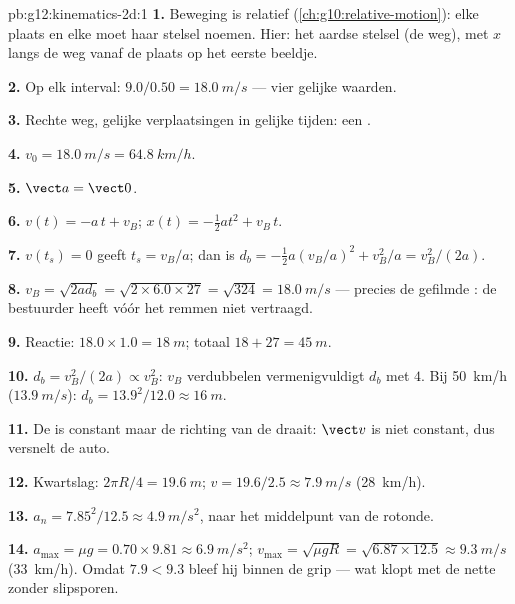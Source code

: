 \begin{solution}{pb:g12:kinematics-2d:1}
\textbf{1.} Beweging is relatief (\cref{ch:g10:relative-motion}): elke
plaats en elke  moet haar stelsel noemen. Hier: het aardse stelsel
(de weg), met $x$ langs de weg vanaf de plaats op het eerste beeldje.

\textbf{2.} Op elk interval: $9.0/0.50 = \qty{18.0}{m/s}$ --- vier gelijke
waarden.

\textbf{3.} Rechte weg, gelijke verplaatsingen in gelijke tijden: een
.

\textbf{4.} $v_0 = \qty{18.0}{m/s} = \qty{64.8}{km/h}$.

\textbf{5.} $\vect a = \vect 0$.

\textbf{6.} $v(t) = -a\,t + v_B$; $x(t) = -\tfrac12 a t^2 + v_B\,t$.

\textbf{7.} $v(t_s) = 0$ geeft $t_s = v_B/a$; dan is
$d_b = -\tfrac12 a (v_B/a)^2 + v_B^2/a = v_B^2/(2a)$.

\textbf{8.} $v_B = \sqrt{2 a d_b} = \sqrt{2 \times 6.0 \times 27} =
\sqrt{324} = \qty{18.0}{m/s}$ --- precies de gefilmde : de
bestuurder heeft vóór het remmen niet vertraagd.

\textbf{9.} Reactie: $18.0 \times 1.0 = \qty{18}{m}$; totaal
$18 + 27 = \qty{45}{m}$.

\textbf{10.} $d_b = v_B^2/(2a) \propto v_B^2$: $v_B$ verdubbelen
vermenigvuldigt $d_b$ met $4$. Bij \qty{50}{km/h} ($\qty{13.9}{m/s}$):
$d_b = 13.9^2/12.0 \approx \qty{16}{m}$.

\textbf{11.} De  is constant maar de richting van de
 draait: $\vect v$ is niet constant, dus versnelt de auto.

\textbf{12.} Kwartslag: $2\pi R/4 = \qty{19.6}{m}$;
$v = 19.6/2.5 \approx \qty{7.9}{m/s}$ (\qty{28}{km/h}).

\textbf{13.} $a_n = 7.85^2/12.5 \approx \qty{4.9}{m/s^2}$, naar het
middelpunt van de rotonde.

\textbf{14.} $a_{\max} = \mu g = 0.70 \times 9.81 \approx
\qty{6.9}{m/s^2}$; $v_{\max} = \sqrt{\mu g R} = \sqrt{6.87 \times 12.5}
\approx \qty{9.3}{m/s}$ (\qty{33}{km/h}). Omdat $7.9 < 9.3$ bleef hij
binnen de grip --- wat klopt met de nette  zonder slipsporen.


\end{solution}
